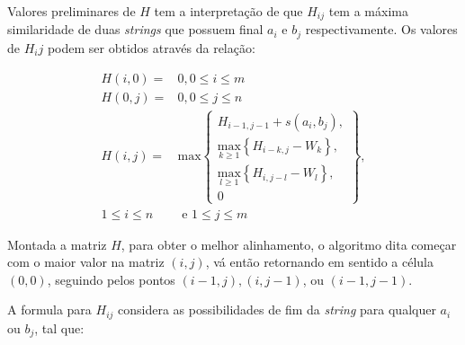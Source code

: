 Valores preliminares de $H$ tem a interpretação de que $H_{ij}$ tem a máxima similaridade de duas \textit{strings} que possuem final $a_i$ e $b_j$ respectivamente. Os valores de $H_ij$ podem ser obtidos através da relação:


\begin{align*}
	H(i,0) =& 0, 0 \leq i \leq m \\
	H(0,j) =& 0, 0 \leq j \leq n \\
	H(i,j) =& \text{max}
	\begin{Bmatrix}
		H_{i-1,j-1} + s(a_i,b_j) ,\\
		\underset{k\geq1}{\text{max}} \left\{H_{i-k,j} - W_k\right\} ,\\
		\underset{l\geq1}{\text{max}} \left\{H_{i,j-l} - W_l\right\} ,\\
		0
	\end{Bmatrix},\\
	1 \leq i \leq n& \text{ e } 1 \leq j \leq m
\end{align*}


Montada a matriz $H$, para obter o melhor alinhamento, o algoritmo dita começar com o maior valor na matriz $(i,j)$, vá então retornando em sentido a célula $(0,0)$, seguindo pelos pontos $(i - 1,j), (i, j - 1)$, ou $(i - 1, j - 1)$.

A formula para $H_{ij}$ considera as possibilidades de fim da \textit{string} para qualquer $a_i$ ou $b_j$, tal que:

